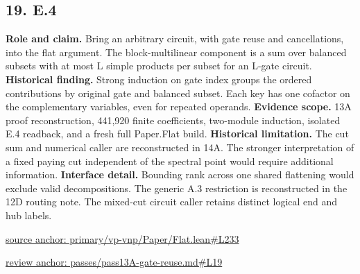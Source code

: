 \documentclass[11pt,letterpaper]{article}
\theoremstyle{definition}\newtheorem{definition}[theorem]{Definition}\newtheorem{example}[theorem]{Example}
\theoremstyle{remark}\newtheorem{remark}[theorem]{Remark}
\begin{document}
\subsection*{19. E.4}
\textbf{Role and claim.} Bring an arbitrary circuit, with gate reuse and cancellations, into the flat argument. The block-multilinear component is a sum over balanced subsets with at most L simple products per subset for an L-gate circuit.
\textbf{Historical finding.} Strong induction on gate index groups the ordered contributions by original gate and balanced subset. Each key has one cofactor on the complementary variables, even for repeated operands.
\textbf{Evidence scope.} 13A proof reconstruction, 441,920 finite coefficients, two-module induction, isolated E.4 readback, and a fresh full Paper.Flat build.
\textbf{Historical limitation.} The cut sum and numerical caller are reconstructed in 14A. The stronger interpretation of a fixed paying cut independent of the spectral point would require additional information.
\textbf{Interface detail.} Bounding rank across one shared flattening would exclude valid decompositions. The generic A.3 restriction is reconstructed in the 12D routing note. The mixed-cut circuit caller retains distinct logical end and hub labels.
\par\href{https://github.com/nousentllc/VP-VNP-Review/blob/8a7976933b6b2b4ffda1ad3a0dfb5fc6b6f023e8/primary/vp-vnp/Paper/Flat.lean\#L233}{source anchor: primary/vp-vnp/Paper/Flat.lean\#L233}
\par\href{https://github.com/nousentllc/VP-VNP-Review/blob/8a7976933b6b2b4ffda1ad3a0dfb5fc6b6f023e8/passes/pass13A-gate-reuse.md\#L19}{review anchor: passes/pass13A-gate-reuse.md\#L19}
\goodbreak
{}
\hypertarget{claim.20}{}
\end{document}
